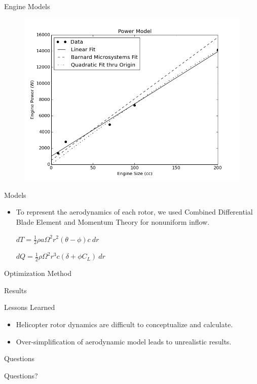\documentclass{beamer}
\begin{document}
\begin{frame}{Engine Models}	
	\begin{figure}
		\begin{center}
			\includegraphics[width=.70\textwidth]{../max_power.png}
			\label{fig:eng_power}
		\end{center}
	\end{figure}
	
\end{frame}

\begin{frame}{Models}
	\begin{itemize}
		\item{To represent the aerodynamics of each rotor, we used Combined Differential Blade Element and Momentum Theory for nonuniform inflow.}
		\begin{center}
		$ dT = \frac{1}{2} \rho a \Omega^2 r^2 (\theta - \phi) c \  dr $
		
		$ dQ = \frac{1}{2} \rho \Omega^2 r^3 c (\delta + \phi C_L) \ dr $
		\end{center}
	\end{itemize}

\end{frame}

\begin{frame}{Optimization Method}

\end{frame}

\begin{frame}{Results}

\end{frame}

\begin{frame}{Lessons Learned}
	\begin{itemize}
		\item{Helicopter rotor dynamics are difficult to conceptualize and calculate.}
		\item{Over-simplification of aerodynamic model leads to unrealistic results.}
		
		
	
	\end{itemize}
\end{frame}

\begin{frame}{Questions}
	
		\begin{center}
			Questions?
		\end{center}
	
\end{frame}
\end{document}
